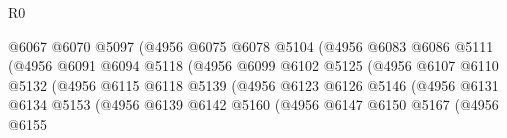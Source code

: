 \begin{lexlean}{R0}
\begin{coremodule}
                                          @6067
                                          @6070
                                          @5097
                                          (@4956
                                            @6075
                                            @6078
                                            @5104
                                            (@4956
                                              @6083
                                              @6086
                                              @5111
                                              (@4956
                                                @6091
                                                @6094
                                                @5118
                                                (@4956
                                                  @6099
                                                  @6102
                                                  @5125
                                                  (@4956
                                                    @6107
                                                    @6110
                                                    @5132
                                                    (@4956
                                                      @6115
                                                      @6118
                                                      @5139
                                                      (@4956
                                                        @6123
                                                        @6126
                                                        @5146
                                                        (@4956
                                                          @6131
                                                          @6134
                                                          @5153
                                                          (@4956
                                                            @6139
                                                            @6142
                                                            @5160
                                                            (@4956
                                                              @6147
                                                              @6150
                                                              @5167
                                                              (@4956
                                                                @6155

\end{coremodule}
\end{lexlean}
